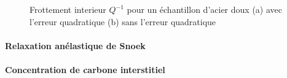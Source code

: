 \begin{figure}[h]
    \centering
    \begin{subfigure}{0.48\linewidth}
        \centering
        \caption{}
        \label{fig:acier_doux_temp_unadjusted}
    \end{subfigure}
    \begin{subfigure}{0.48\linewidth}
        \centering
        \caption{}
        \label{fig:acier_doux_temp_adjusted}
    \end{subfigure}
    \caption{Frottement interieur \(Q^{-1}\) pour un échantillon d'acier doux (a) avec l'erreur quadratique (b) sans l'erreur quadratique}
\end{figure}

\paragraph{Relaxation anélastique de Snoek}

\paragraph{Concentration de carbone interstitiel}
